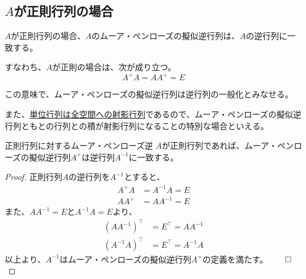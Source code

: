 \documentclass[../../../topic_linear-algebra]{subfiles}
\begin{document}
\subsection{$A$が正則行列の場合}

$A$が正則行列の場合、$A$のムーア・ペンローズの擬似逆行列は、$A$の逆行列に一致する。

すなわち、$A$が正則の場合は、次が成り立つ。
\begin{equation*}
  A^+ A = A A^+ = E
\end{equation*}

この意味で、ムーア・ペンローズの擬似逆行列は逆行列の一般化とみなせる。

\br

また、\hyperref[sec:identity-to-projections]{単位行列は全空間への射影行列}であるので、ムーア・ペンローズの擬似逆行列ともとの行列との積が射影行列になることの特別な場合といえる。

\begin{theorem}{正則行列に対するムーア・ペンローズ逆}
  $A$が正則行列であれば、ムーア・ペンローズの擬似逆行列$A^+$は逆行列$A^{-1}$に一致する。
\end{theorem}

\begin{proof}
  正則行列$A$の逆行列を$A^{-1}$とすると、
  \begin{align*}
    A^+ A &= A^{-1} A = E \\
    A A^+ &= A A^{-1} = E
  \end{align*}
  また、$AA^{-1} = E$と$A^{-1}A = E$より、
  \begin{align*}
    (AA^{-1})^\top & = E^\top = AA^{-1} \\
    (A^{-1}A)^\top & = E^\top = A^{-1}A
  \end{align*}
  以上より、$A^{-1}$はムーア・ペンローズの擬似逆行列$A^+$の定義を満たす。$\qed$
\end{proof}
\end{document}
